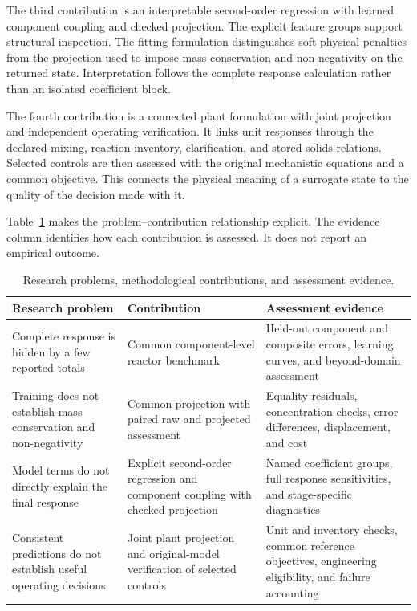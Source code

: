 The third contribution is an interpretable second-order regression with learned component coupling and checked projection. The explicit feature groups support structural inspection. The fitting formulation distinguishes soft physical penalties from the projection used to impose mass conservation and non-negativity on the returned state. Interpretation follows the complete response calculation rather than an isolated coefficient block.

The fourth contribution is a connected plant formulation with joint projection and independent operating verification. It links unit responses through the declared mixing, reaction-inventory, clarification, and stored-solids relations. Selected controls are then assessed with the original mechanistic equations and a common objective. This connects the physical meaning of a surrogate state to the quality of the decision made with it.

Table~\ref{tab:introduction_contributions} makes the problem--contribution relationship explicit. The evidence column identifies how each contribution is assessed. It does not report an empirical outcome.

\begin{table}[htbp]
\centering\small
\caption{Research problems, methodological contributions, and assessment evidence.}
\label{tab:introduction_contributions}
\begin{tabular}{p{}p{}p{}}
\toprule
Research problem & Contribution & Assessment evidence\\
\midrule
Complete response is hidden by a few reported totals & Common component-level reactor benchmark & Held-out component and composite errors, learning curves, and beyond-domain assessment\\
Training does not establish mass conservation and non-negativity & Common projection with paired raw and projected assessment & Equality residuals, concentration checks, error differences, displacement, and cost\\
Model terms do not directly explain the final response & Explicit second-order regression and component coupling with checked projection & Named coefficient groups, full response sensitivities, and stage-specific diagnostics\\
Consistent predictions do not establish useful operating decisions & Joint plant projection and original-model verification of selected controls & Unit and inventory checks, common reference objectives, engineering eligibility, and failure accounting\\
\bottomrule
\end{tabular}
\end{table}

